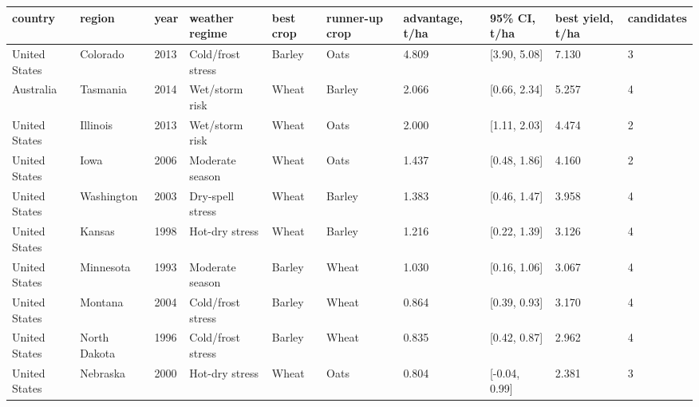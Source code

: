 \begin{tabular}{llllllllll}
\hline
country & region & year & weather regime & best crop & runner-up crop & advantage, t/ha & 95\% CI, t/ha & best yield, t/ha & candidates \\
\hline
United States & Colorado & 2013 & Cold/frost stress & Barley & Oats & 4.809 & [3.90, 5.08] & 7.130 & 3 \\
Australia & Tasmania & 2014 & Wet/storm risk & Wheat & Barley & 2.066 & [0.66, 2.34] & 5.257 & 4 \\
United States & Illinois & 2013 & Wet/storm risk & Wheat & Oats & 2.000 & [1.11, 2.03] & 4.474 & 2 \\
United States & Iowa & 2006 & Moderate season & Wheat & Oats & 1.437 & [0.48, 1.86] & 4.160 & 2 \\
United States & Washington & 2003 & Dry-spell stress & Wheat & Barley & 1.383 & [0.46, 1.47] & 3.958 & 4 \\
United States & Kansas & 1998 & Hot-dry stress & Wheat & Barley & 1.216 & [0.22, 1.39] & 3.126 & 4 \\
United States & Minnesota & 1993 & Moderate season & Barley & Wheat & 1.030 & [0.16, 1.06] & 3.067 & 4 \\
United States & Montana & 2004 & Cold/frost stress & Barley & Wheat & 0.864 & [0.39, 0.93] & 3.170 & 4 \\
United States & North Dakota & 1996 & Cold/frost stress & Barley & Wheat & 0.835 & [0.42, 0.87] & 2.962 & 4 \\
United States & Nebraska & 2000 & Hot-dry stress & Wheat & Oats & 0.804 & [-0.04, 0.99] & 2.381 & 3 \\
\hline
\end{tabular}
